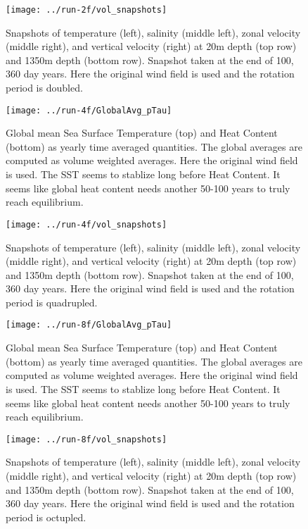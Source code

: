 \documentclass[a4paper,11pt]{article}
\begin{document}
\begin{figure}
\centering
\texttt{[image: ../run-2f/vol\_snapshots]}
\caption{Snapshots of temperature (left), salinity (middle left), zonal velocity (middle right), and vertical velocity (right) at 20m depth (top row) and 1350m depth (bottom row). Snapshot taken at the end of 100, 360 day years. Here the original wind field is used and the rotation period is doubled. }
\label{fig:2f_volSnaps}
\end{figure}


\begin{figure}
\centering
\texttt{[image: ../run-4f/GlobalAvg\_pTau]}
\caption{Global mean Sea Surface Temperature (top) and Heat Content (bottom) as yearly time averaged quantities. The global averages are computed as volume weighted averages. Here the original wind field is used. The SST seems to stablize long before Heat Content. It seems like global heat content needs another 50-100 years to truly reach equilibrium. }
\label{fig:4f_globalAvgs}
\end{figure}

\begin{figure}
\centering
\texttt{[image: ../run-4f/vol\_snapshots]}
\caption{Snapshots of temperature (left), salinity (middle left), zonal velocity (middle right), and vertical velocity (right) at 20m depth (top row) and 1350m depth (bottom row). Snapshot taken at the end of 100, 360 day years. Here the original wind field is used and the rotation period is quadrupled. }
\label{fig:4f_volSnaps}
\end{figure}


\begin{figure}
\centering
\texttt{[image: ../run-8f/GlobalAvg\_pTau]}
\caption{Global mean Sea Surface Temperature (top) and Heat Content (bottom) as yearly time averaged quantities. The global averages are computed as volume weighted averages. Here the original wind field is used. The SST seems to stablize long before Heat Content. It seems like global heat content needs another 50-100 years to truly reach equilibrium. }
\label{fig:8f_globalAvgs}
\end{figure}

\begin{figure}
\centering
\texttt{[image: ../run-8f/vol\_snapshots]}
\caption{Snapshots of temperature (left), salinity (middle left), zonal velocity (middle right), and vertical velocity (right) at 20m depth (top row) and 1350m depth (bottom row). Snapshot taken at the end of 100, 360 day years. Here the original wind field is used and the rotation period is octupled. }
\label{fig:8f_volSnaps}
\end{figure}
\end{document}
